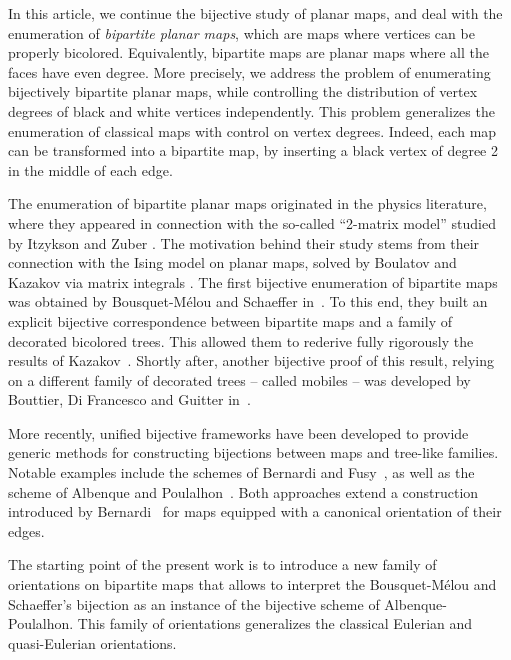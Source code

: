\documentclass[11pt,reqno,tbtags]{amsart}
\numberwithin{equation}{section}
\numberwithin{theo}{section}
\theoremstyle{definition}
\begin{document}
\smallskip

In this article, we continue the bijective study of planar maps, and deal with the enumeration of \emph{bipartite planar maps}, which are maps where vertices can be properly bicolored. Equivalently, bipartite maps are planar maps where all the faces have even degree. More precisely, we address the problem of enumerating bijectively bipartite planar maps, while controlling the distribution of vertex degrees of black and white vertices independently. This problem generalizes the enumeration of classical maps with control on vertex degrees. Indeed, each map can be transformed into a bipartite map, by inserting a black vertex of degree 2 in the middle of each edge. 

The enumeration of bipartite planar maps originated in the physics literature, where they appeared in connection with the so-called ``2-matrix model'' studied by Itzykson and Zuber \cite{Itzykson1980}. The motivation behind their study stems from their connection with the Ising model on planar maps, solved by Boulatov and Kazakov  via matrix integrals \cite{KazakovBoulatov87,Kazakov86}. The first bijective enumeration of bipartite maps was obtained by Bousquet-Mélou and Schaeffer in~\cite{BousquetMelouSchaeffer_Bipartite}. To this end, they built an explicit bijective correspondence between bipartite maps and a family of decorated bicolored trees. This allowed them to rederive fully rigorously the results of Kazakov~\cite{Kazakov86}. Shortly after, another bijective proof of this result, relying on a different family of decorated trees -- called mobiles -- was developed by Bouttier, Di Francesco and Guitter in~\cite{BouttierDiFrancescoGuitter_Mobiles}.

More recently, unified bijective frameworks have been developed to provide generic methods for constructing bijections between maps and tree-like families. Notable examples include the schemes of Bernardi and Fusy~\cite{BernardiFusy_Boundaries, BernardiFusy_Girth, BernardiFusy_Hypermaps, BernardiFusy_TrigQuadPent}, as well as the scheme of Albenque and Poulalhon~\cite{AlbenquePoulalhon_Generic}. Both approaches extend a construction introduced by Bernardi~\cite{Bernardi07} for maps equipped with a canonical orientation of their edges.

\smallskip

The starting point of the present work is to introduce a new family of orientations on bipartite maps that allows to interpret the Bousquet-Mélou and Schaeffer's bijection as an instance of the bijective scheme of Albenque-Poulalhon. This family of orientations generalizes the classical Eulerian and quasi-Eulerian orientations. 
\end{document}
